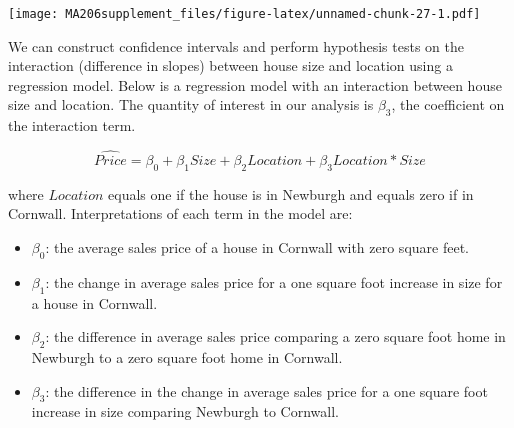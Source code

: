 \documentclass[]{book}
\newenvironment{Shaded}{\begin{snugshade}}{\end{snugshade}}
\newcommand{\DataTypeTok}[1]{\textcolor[rgb]{0.13,0.29,0.53}{#1}}
\newcommand{\KeywordTok}[1]{\textcolor[rgb]{0.13,0.29,0.53}{\textbf{#1}}}
\newcommand{\NormalTok}[1]{#1}
\newcommand{\OperatorTok}[1]{\textcolor[rgb]{0.81,0.36,0.00}{\textbf{#1}}}
\newcommand{\OtherTok}[1]{\textcolor[rgb]{0.56,0.35,0.01}{#1}}
\newcommand{\StringTok}[1]{\textcolor[rgb]{0.31,0.60,0.02}{#1}}
\begin{document}
\begin{Shaded}
\end{Shaded}

\texttt{[image: MA206supplement\_files/figure-latex/unnamed-chunk-27-1.pdf]}

We can construct confidence intervals and perform hypothesis tests on the interaction (difference in slopes) between house size and location using a regression model. Below is a regression model with an interaction between house size and location. The quantity of interest in our analysis is \(\beta_3\), the coefficient on the interaction term.

\[\widehat{Price} = \beta_0 + \beta_1 Size + \beta_2 Location + \beta_3 Location * Size\]

where \(Location\) equals one if the house is in Newburgh and equals zero if in Cornwall. Interpretations of each term in the model are:

\begin{itemize}
\item
  \(\beta_0\): the average sales price of a house in Cornwall with zero square feet.
\item
  \(\beta_1\): the change in average sales price for a one square foot increase in size for a house in Cornwall.
\item
  \(\beta_2\): the difference in average sales price comparing a zero square foot home in Newburgh to a zero square foot home in Cornwall.
\item
  \(\beta_3\): the difference in the change in average sales price for a one square foot increase in size comparing Newburgh to Cornwall.
\end{itemize}
\end{document}
